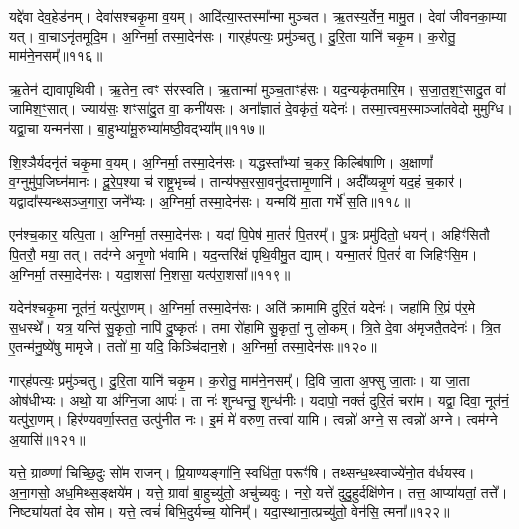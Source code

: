 यद्दे॑वा देव॒हेड॑नम्।
देवा॑सश्चकृ॒मा व॒यम्।
आदि॑त्या॒\-स्तस्मा᳚न्मा मुञ्चत।
ऋ॒तस्य॒र्तेन॒ मामु॒त।
देवा॑ जीवनका॒म्या यत्।
वा॒चा\-ऽनृ॑तमूदि॒म।
अ॒ग्निर्मा॒ तस्मा॒देन॑सः।
गार्‌\mbox{}ह॑पत्यः॒ प्रमु॑ञ्चतु।
दु॒रि॒ता यानि॑ चकृ॒म।
क॒रोतु॒ माम॑ने॒नसम्᳚॥११६॥\ip

ऋ॒तेन॑ द्यावापृथिवी।
ऋ॒तेन॒ त्वꣳ स॑रस्वति।
ऋ॒तान्मा॑ मुञ्च॒ताꣳह॑सः।
यद॒न्यकृ॑तमारि॒म।
स॒जा॒त॒श॒ꣳ॒सादु॒त वा॑ जामिश॒ꣳ॒सात्।
ज्याय॑सः॒ शꣳसा॑दु॒त वा॒ कनी॑यसः।
अना᳚ज्ञातं दे॒वकृ॑तं॒ यदेनः॑।
तस्मा॒त्त्वम॒स्माञ्जा॑तवेदो मुमुग्धि।
यद्वा॒चा यन्मन॑सा।
बा॒हुभ्या॑मू॒रुभ्या॑मष्ठी॒वद्भ्या᳚म्॥११७॥\ip

शि॒श्ञैर्यदनृ॑तं चकृ॒मा व॒यम्।
अ॒ग्निर्मा॒ तस्मा॒देन॑सः।
यद्धस्ता᳚भ्यां च॒कर॒ किल्बि॑षाणि।
अ॒क्षाणां᳚ व॒ग्नुमु॑प॒जिघ्न॑मानः।
दू॒रे॒प॒श्या च॑ राष्ट्र॒भृच्च॑।
तान्य॑फ्स॒रसा॒वनु॑दत्तामृ॒णानि॑।
अदी᳚व्यन्नृ॒णं यद॒हं च॒कार॑।
यद्वादा᳚स्यन्थ्सञ्ज॒गारा॒ जने᳚भ्यः।
अ॒ग्निर्मा॒ तस्मा॒देन॑सः।
यन्मयि॑ मा॒ता गर्भे॑ स॒ति॥११८॥\ip

एन॑श्च॒कार॒ यत्पि॒ता।
अ॒ग्निर्मा॒ तस्मा॒देन॑सः।
यदा॑ पि॒पेष॑ मा॒तरं॑ पि॒तरम्᳚।
पु॒त्रः प्रमु॑दितो॒ धयन्॑।
अहिꣳ॑सितौ पि॒तरौ॒ मया॒ तत्।
तद॑ग्ने अनृ॒णो भ॑वामि।
यद॒न्तरि॑क्षं पृथि॒वीमु॒त द्याम्।
यन्मा॒तरं॑ पि॒तरं॑ वा जिहिꣳसि॒म।
अ॒ग्निर्मा॒ तस्मा॒देन॑सः।
यदा॒शसा॑ नि॒शसा॒ यत्प॑रा॒शसा᳚॥११९॥\ip

यदेन॑श्चकृ॒मा नूत॑नं॒ यत्पु॑रा॒णम्।
अ॒ग्निर्मा॒ तस्मा॒देन॑सः।
अति॑ क्रामामि दुरि॒तं यदेनः॑।
जहा॑मि रि॒प्रं प॑र॒मे स॒धस्थे᳚।
यत्र॒ यन्ति॑ सु॒कृतो॒ नापि॑ दु॒ष्कृतः॑।
तमा रो॑हामि सु॒कृतां॒ नु लो॒कम्।
त्रि॒ते दे॒वा अ॑मृजतै॒तदेनः॑।
त्रि॒त ए॒तन्म॑नु॒ष्ये॑षु मामृजे।
ततो॑ मा॒ यदि॒ किञ्चि॑दान॒शे।
अ॒ग्निर्मा॒ तस्मा॒देन॑सः॥१२०॥\ip

गार्‌\mbox{}ह॑पत्यः॒ प्रमु॑ञ्चतु।
दु॒रि॒ता यानि॑ चकृ॒म।
क॒रोतु॒ माम॑ने॒नसम्᳚।
दि॒वि जा॒ता अ॒फ्सु जा॒ताः।
या जा॒ता ओष॑धीभ्यः।
अथो॒ या अ॑ग्नि॒जा आपः॑।
ता नः॑ शुन्धन्तु॒ शुन्ध॑नीः।
यदापो॒ नक्तं॑ दुरि॒तं चरा॑म।
यद्वा॒ दिवा॒ नूत॑नं॒ यत्पु॑रा॒णम्।
हिर॑ण्यवर्णा॒स्तत॒ उत्पु॑नीत नः।
इ॒मं मे॑ वरुण॒ तत्त्वा॑ यामि।
त्वन्नो॑ अग्ने॒ स त्वन्नो॑ अग्ने।
त्वम॑ग्ने अ॒यासि॑॥१२१॥\ip\anuvakamend[अ॒ने॒नस॑मष्ठी॒वद्भ्याꣳ॑ स॒ति प॑रा॒शसा॑\-ऽऽन॒शे᳚\-ऽग्निर्मा॒ तस्मा॒देन॑सः पुनीत न॒स्त्रीणि॑ च (यद्दे॑वा॒ देवा॑ ऋ॒तेन॑ सजातश॒ꣳ॒साद्यद्वा॒चा यद्धस्ता᳚भ्या॒मदी᳚व्यं॒ यन्मयि॑ मा॒ता यदा॑ पि॒पेष॒ यद॒न्तरि॑क्षं॒ यदा॒शसाऽति॑ क्रामामि त्रि॒ते दे॒वा दि॒वि जा॒ता अ॒फ्सु जा॒ता यदाप॑ इ॒मं मे॑ वरुण॒ तत्त्वा॑ यामि॒ त्वन्नो॑ अग्ने॒ स त्वन्नो॑ अग्ने॒ त्वम॑ग्ने अ॒यासि॑।)]

यत्ते॒ ग्राव्ण्णा॑ चिच्छि॒दुः सो॑म राजन्।
प्रि॒याण्यङ्गा॑नि॒ स्वधि॑ता॒ परूꣳ॑षि।
तथ्सन्ध॒थ्स्वाज्ये॑नो॒त व॑र्धयस्व।
अ॒ना॒गसो॒ अध॒मिथ्स॒ङ्क्षये॑म।
यत्ते॒ ग्रावा॑ बा॒हुच्यु॑तो॒ अचु॑च्यवुः।
नरो॒ यत्ते॑ दुदु॒हुर्दक्षि॑णेन।
तत्त॒ आप्या॑यतां॒ तत्ते᳚।
निष्ट्या॑यतां देव सोम।
यत्ते॒ त्वचं॑ बिभि॒दुर्यच्च॒ योनिम्᳚।
यदा॒स्थाना॒त्प्रच्यु॑तो॒ वेन॑सि॒ त्मना᳚॥१२२॥\ip


